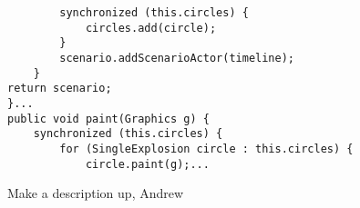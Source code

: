 \begin{figure}
\begin{center}
\begin{verbatim}
        synchronized (this.circles) {
            circles.add(circle);
        }
        scenario.addScenarioActor(timeline);
    }
return scenario;
}...
public void paint(Graphics g) {
    synchronized (this.circles) {
        for (SingleExplosion circle : this.circles) {
            circle.paint(g);...
\end{verbatim}
\end{center}
\caption{Make a description up, Andrew}
\label{fig:frameworkExamples}
\end{figure}